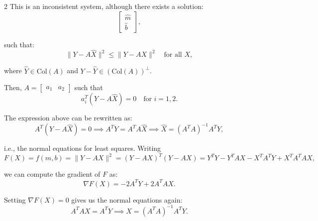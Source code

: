 \documentclass[11pt]{article}
\begin{document}
\begin{multicols}{2}
This is an inconsistent system, although there exists a solution:
\[\begin{bmatrix} \hat{m} \\ \hat{b} \end{bmatrix},\]

such that:
\[\| Y - A\hat{X} \|^2 \leq \| Y - AX \|^2 \quad \text{for all } X,\]

where \(\hat{Y} \in \text{Col}(A)\) and \(Y - \hat{Y} \in (\text{Col}(A))^{\perp}\). 

\columnbreak
\begin{center}
\end{center}

\end{multicols}

Then, \(A = \begin{bmatrix} a_1 & a_2 \end{bmatrix}\) such that 
\[a_i^T (Y - A\hat{X}) = 0 \quad \text{for } i = 1, 2.\]

The expression above can be rewritten as:
\[A^T (Y - A\hat{X}) = 0 \implies A^T Y = A^T A \hat{X} \implies \hat{X} = (A^T A)^{-1} A^T Y,\]

i.e., the normal equations for least squares. Writing
\[F(X) = f(m, b) = \|Y - AX\|^2 = (Y - AX)^T (Y - AX) = Y^T Y - Y^T A X - X^T A^T Y + X^T A^T A X,\]

we can compute the gradient of \(F\) as:
\[\nabla F(X) = -2 A^T Y + 2 A^T A X.\]

Setting \(\nabla F(X) = 0\) gives us the normal equations again:
\[A^T A X = A^T Y \implies X = (A^T A)^{-1} A^T Y.\]
\end{document}
